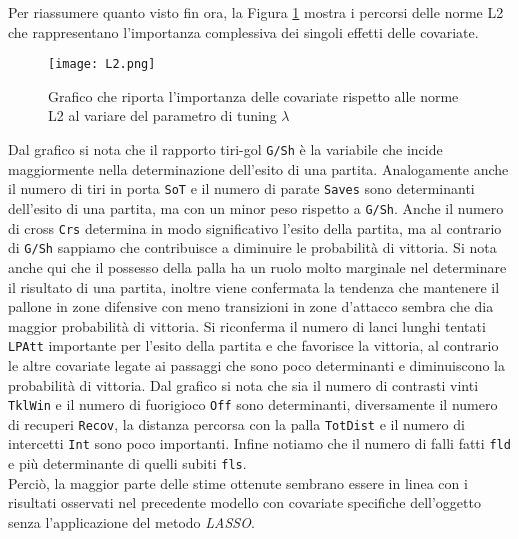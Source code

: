 Per riassumere quanto visto fin ora, la Figura \ref{fig:l2BTCL} mostra i percorsi delle norme L2 che rappresentano l'importanza complessiva dei singoli effetti delle covariate.

\begin{figure}[htbp]
	\begin{center}
		\texttt{[image: L2.png]}
		\caption{Grafico che riporta l'importanza delle covariate rispetto alle norme L2 al variare del parametro di tuning $\lambda$} \label{fig:l2BTCL}
	\end{center}
\end{figure}
Dal grafico si nota che il rapporto tiri-gol \texttt{G/Sh} è la variabile che incide maggiormente nella determinazione dell'esito di una partita. Analogamente anche il numero di tiri in porta \texttt{SoT} e il numero di parate \texttt{Saves} sono determinanti dell'esito di una partita, ma con un minor peso rispetto a \texttt{G/Sh}. Anche il numero di cross \texttt{Crs} determina in modo significativo l'esito della partita, ma al contrario di \texttt{G/Sh} sappiamo che contribuisce a diminuire le probabilità di vittoria. Si nota anche qui che il possesso della palla ha un ruolo molto marginale nel determinare il risultato di una partita, inoltre viene confermata la tendenza che mantenere il pallone in zone difensive con meno transizioni in zone d'attacco sembra che dia maggior probabilità di vittoria. Si riconferma il numero di lanci lunghi tentati \texttt{LPAtt} importante per l'esito della partita e che favorisce la vittoria, al contrario le altre covariate legate ai passaggi che sono poco determinanti e diminuiscono la probabilità di vittoria. Dal grafico si nota che sia il numero di contrasti vinti \texttt{TklWin} e il numero di fuorigioco \texttt{Off} sono determinanti, diversamente il numero di recuperi \texttt{Recov}, la distanza percorsa con la palla \texttt{TotDist} e il numero di intercetti \texttt{Int} sono poco importanti. Infine notiamo che il numero di falli fatti \texttt{fld} e più determinante di quelli subiti \texttt{fls}.\\
Perciò, la maggior parte delle stime ottenute sembrano essere in linea con i risultati osservati nel precedente modello con covariate specifiche dell'oggetto senza l'applicazione del metodo \emph{LASSO}.


